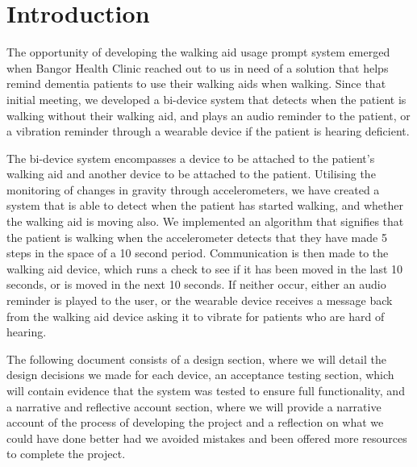 \chapter{Introduction}

The opportunity of developing the walking aid usage prompt system emerged when Bangor Health Clinic reached out to us in need of a solution that helps remind dementia patients to use their walking aids when walking. Since that initial meeting, we developed a bi-device system that detects when the patient is walking without their walking aid, and plays an audio reminder to the patient, or a vibration reminder through a wearable device if the patient is hearing deficient. 

The bi-device system encompasses a device to be attached to the patient's walking aid and another device to be attached to the patient. Utilising the monitoring of changes in gravity through accelerometers, we have created a system that is able to detect when the patient has started walking, and whether the walking aid is moving also. We implemented an algorithm that signifies that the patient is walking when the accelerometer detects that they have made 5 steps in the space of a 10 second period. Communication is then made to the walking aid device, which runs a check to see if it has been moved in the last 10 seconds, or is moved in the next 10 seconds. If neither occur, either an audio reminder is played to the user, or the wearable device receives a message back from the walking aid device asking it to vibrate for patients who are hard of hearing. 

The following document consists of a design section, where we will detail the design decisions we made for each device, an acceptance testing section, which will contain evidence that the system was tested to ensure full functionality, and a narrative and reflective account section, where we will provide a narrative account of the process of developing the project and a reflection on what we could have done better had we avoided mistakes and been offered more resources to complete the project.